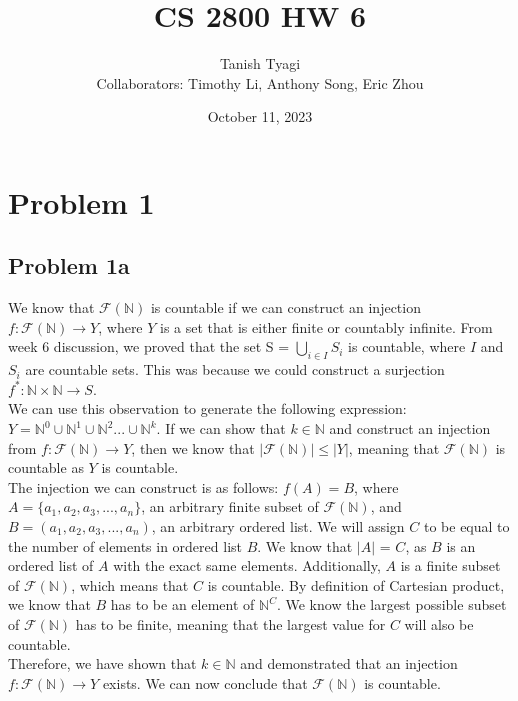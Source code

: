 \documentclass{article}
\title{\textbf{CS 2800 HW 6}}
\author{Tanish Tyagi \\ Collaborators: Timothy Li, Anthony Song, Eric Zhou}
\date{October 11, 2023}
\begin{document}
\maketitle

\section{Problem 1}

\subsection{Problem 1a}

We know that $\mathcal{F}(\mathbb{N})$ is countable if we can construct an injection $f: \mathcal{F}(\mathbb{N}) \rightarrow Y$, where $Y$ is a set that is either finite or countably infinite. From week 6 discussion, we proved that the set S = $\bigcup_{i \in I} S_i$ is countable, where $I$ and $S_i$ are countable sets. This was because we could construct a surjection $f^{*}: \mathbb{N} \times \mathbb{N} \rightarrow S$. \\

We can use this observation to generate the following expression: $Y = \mathbb{N}^0 \cup \mathbb{N}^1 \cup \mathbb{N}^2 ... \cup \mathbb{N}^k$. If we can show that $k \in \mathbb{N}$ and construct an injection from $f: \mathcal{F}(\mathbb{N}) \rightarrow Y$, then we know that $|\mathcal{F}(\mathbb{N})| \le |Y|$, meaning that $\mathcal{F}(\mathbb{N})$ is countable as $Y$ is countable. \\

The injection we can construct is as follows: $f(A) = B$, where $A = \{a_1, a_2, a_3, ..., a_n\}$, an arbitrary finite subset of $\mathcal{F}(\mathbb{N})$, and $B = (a_1, a_2, a_3, ..., a_n)$, an arbitrary ordered list. We will assign $C$ to be equal to the number of elements in ordered list $B$. We know that $|A|$ = $C$, as $B$ is an ordered list of $A$ with the exact same elements. Additionally, $A$ is a finite subset of $\mathcal{F}(\mathbb{N})$, which means that $C$ is countable. By definition of Cartesian product, we know that $B$ has to be an element of $\mathbb{N}^C$. We know the largest possible subset of $\mathcal{F}(\mathbb{N})$ has to be finite, meaning that the largest value for $C$ will also be countable. \\

Therefore, we have shown that $k \in \mathbb{N}$ and demonstrated that an injection $f: \mathcal{F}(\mathbb{N}) \rightarrow Y$ exists. We can now conclude that $\mathcal{F}(\mathbb{N})$ is countable.
\end{document}
